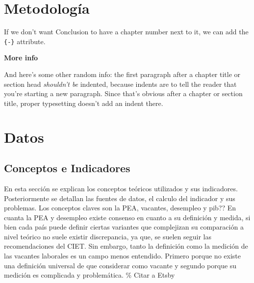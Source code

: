 \documentclass[msc,oneside,a4paper]{udelar} %
\begin{document}
  \hypertarget{metodologuxeda}{%
  \chapter{Metodología}\label{metodologuxeda}}
  
  If we don't want Conclusion to have a chapter number next to it, we can add the \texttt{\{-\}} attribute.
  
  \textbf{More info}
  
  And here's some other random info: the first paragraph after a chapter title or section head \emph{shouldn't be} indented, because indents are to tell the reader that you're starting a new paragraph. Since that's obvious after a chapter or section title, proper typesetting doesn't add an indent there.
  
  \hypertarget{datos}{%
  \chapter{Datos}\label{datos}}
  
  \section{Conceptos e Indicadores}
  
  En esta sección se explican los conceptos teóricos utilizados y sus indicadores. Posteriormente se detallan las fuentes de datos, el calculo del indicador y sus problemas. Los conceptos claves son la PEA, vacantes, desempleo y pib??
  En cuanta la PEA y desempleo existe consenso en cuanto a su definición y medida, si bien cada país puede definir ciertas variantes que complejizan su comparación a nivel teórico no suele existir discrepancia, ya que, se suelen seguir las recomendaciones del CIET.
  Sin embargo, tanto la definición como la medición de las vacantes laborales es un campo menos entendido. Primero porque no existe una definición universal de que considerar como vacante y segundo porque su medición es complicada y problemática.
  \% Citar a Etsby
  
\end{document}
